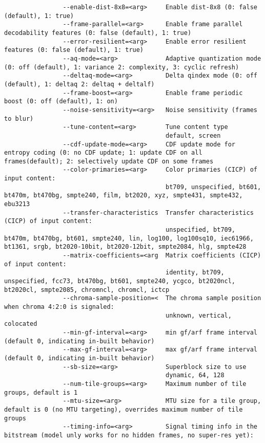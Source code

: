 \begin{appendices}
\begin{lstlisting}
                --enable-dist-8x8=<arg>     Enable dist-8x8 (0: false (default), 1: true)
                --frame-parallel=<arg>      Enable frame parallel decodability features (0: false (default), 1: true)
                --error-resilient=<arg>     Enable error resilient features (0: false (default), 1: true)
                --aq-mode=<arg>             Adaptive quantization mode (0: off (default), 1: variance 2: complexity, 3: cyclic refresh)
                --deltaq-mode=<arg>         Delta qindex mode (0: off (default), 1: deltaq 2: deltaq + deltalf)
                --frame-boost=<arg>         Enable frame periodic boost (0: off (default), 1: on)
                --noise-sensitivity=<arg>   Noise sensitivity (frames to blur)
                --tune-content=<arg>        Tune content type
                                            default, screen
                --cdf-update-mode=<arg>     CDF update mode for entropy coding (0: no CDF update; 1: update CDF on all frames(default); 2: selectively update CDF on some frames
                --color-primaries=<arg>     Color primaries (CICP) of input content:
                                            bt709, unspecified, bt601, bt470m, bt470bg, smpte240, film, bt2020, xyz, smpte431, smpte432, ebu3213
                --transfer-characteristics  Transfer characteristics (CICP) of input content:
                                            unspecified, bt709, bt470m, bt470bg, bt601, smpte240, lin, log100, log100sq10, iec61966, bt1361, srgb, bt2020-10bit, bt2020-12bit, smpte2084, hlg, smpte428
                --matrix-coefficients=<arg  Matrix coefficients (CICP) of input content:
                                            identity, bt709, unspecified, fcc73, bt470bg, bt601, smpte240, ycgco, bt2020ncl, bt2020cl, smpte2085, chromncl, chromcl, ictcp
                --chroma-sample-position=<  The chroma sample position when chroma 4:2:0 is signaled:
                                            unknown, vertical, colocated
                --min-gf-interval=<arg>     min gf/arf frame interval (default 0, indicating in-built behavior)
                --max-gf-interval=<arg>     max gf/arf frame interval (default 0, indicating in-built behavior)
                --sb-size=<arg>             Superblock size to use
                                            dynamic, 64, 128
                --num-tile-groups=<arg>     Maximum number of tile groups, default is 1
                --mtu-size=<arg>            MTU size for a tile group, default is 0 (no MTU targeting), overrides maximum number of tile groups
                --timing-info=<arg>         Signal timing info in the bitstream (model unly works for no hidden frames, no super-res yet):

\end{lstlisting}
\end{appendices}
